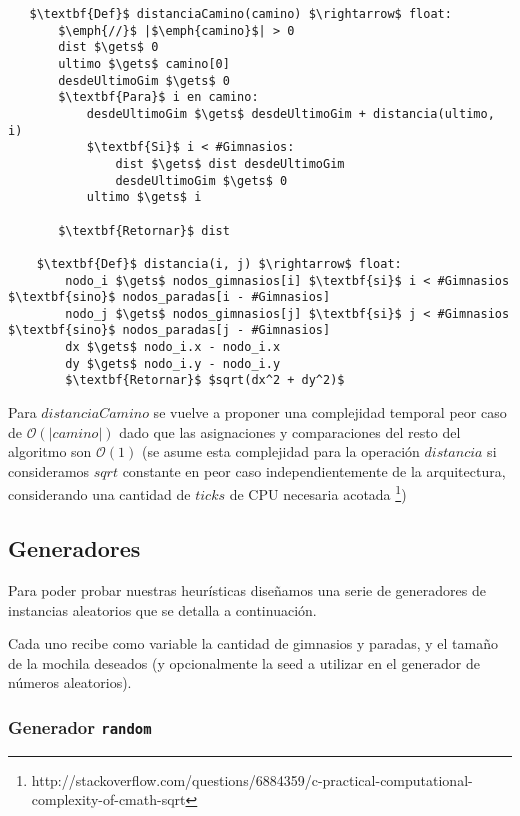    \begin{lstlisting}
   $\textbf{Def}$ distanciaCamino(camino) $\rightarrow$ float:
       $\emph{//}$ |$\emph{camino}$| > 0
       dist $\gets$ 0
       ultimo $\gets$ camino[0]
       desdeUltimoGim $\gets$ 0
       $\textbf{Para}$ i en camino:
           desdeUltimoGim $\gets$ desdeUltimoGim + distancia(ultimo, i)
           $\textbf{Si}$ i < #Gimnasios:
               dist $\gets$ dist desdeUltimoGim
               desdeUltimoGim $\gets$ 0
           ultimo $\gets$ i

       $\textbf{Retornar}$ dist

    $\textbf{Def}$ distancia(i, j) $\rightarrow$ float:
        nodo_i $\gets$ nodos_gimnasios[i] $\textbf{si}$ i < #Gimnasios $\textbf{sino}$ nodos_paradas[i - #Gimnasios]
        nodo_j $\gets$ nodos_gimnasios[j] $\textbf{si}$ j < #Gimnasios $\textbf{sino}$ nodos_paradas[j - #Gimnasios]
        dx $\gets$ nodo_i.x - nodo_i.x
        dy $\gets$ nodo_i.y - nodo_i.y
        $\textbf{Retornar}$ $sqrt(dx^2 + dy^2)$
   \end{lstlisting}

   Para $distanciaCamino$ se vuelve a proponer una complejidad temporal peor caso de $\mathcal{O}(|camino|)$ dado que las asignaciones y comparaciones del resto del algoritmo son $\mathcal{O}(1)$ (se asume esta complejidad para la operación $distancia$ si consideramos $sqrt$ constante en peor caso independientemente de la arquitectura, considerando una cantidad de $ticks$ de CPU necesaria acotada \footnote{http://stackoverflow.com/questions/6884359/c-practical-computational-complexity-of-cmath-sqrt})




\subsection{Generadores}

Para poder probar nuestras heurísticas diseñamos una serie de generadores de instancias aleatorios que se detalla a continuación.

Cada uno recibe como variable la cantidad de gimnasios y paradas, y el tamaño de la mochila deseados
(y opcionalmente la seed a utilizar en el generador de números aleatorios).

\subsubsection{Generador \texttt{random}}
\label{sec:generadores-random}

